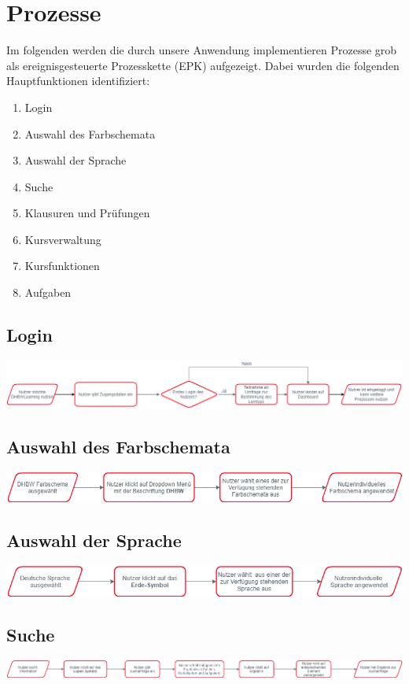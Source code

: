 
\chapter{Prozesse}
Im folgenden werden die durch unsere Anwendung implementieren Prozesse grob als ereignisgesteuerte Prozesskette (EPK) aufgezeigt. Dabei wurden die folgenden Hauptfunktionen identifiziert:
\begin{enumerate}
	\item Login
	\item Auswahl des Farbschemata
	\item Auswahl der Sprache
	\item Suche
	\item Klausuren und Prüfungen
	\item Kursverwaltung
	\item Kursfunktionen
	\item Aufgaben
\end{enumerate}

\section{Login}
	\includegraphics[width=\linewidth, keepaspectratio]{img/Prozesse/login}
\section{Auswahl des Farbschemata}
	\includegraphics[width=\linewidth, keepaspectratio]{img/Prozesse/color}
\section{Auswahl der Sprache}
	\includegraphics[width=\linewidth, keepaspectratio]{img/Prozesse/language}
\section{Suche}
	\includegraphics[width=\linewidth, keepaspectratio]{img/Prozesse/search}
